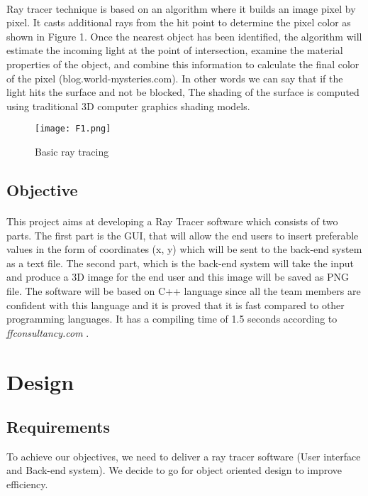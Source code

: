 \documentclass{article}
\begin{document}
\paragraph{}
Ray tracer technique is based on an algorithm where it builds an image pixel by pixel. It casts additional rays from the hit point to determine the pixel color as shown in Figure 1.
Once the nearest object has been identified, the algorithm will estimate the incoming light at the point of intersection, examine the material properties of the object, and combine this information to calculate the final color of the pixel (blog.world-mysteries.com). In other words we can say that if the light hits the surface and not be blocked,  The shading of the surface is computed using traditional 3D computer graphics shading models. 

\begin{figure}
    \centering
    \texttt{[image: F1.png]}
    \caption{Basic ray tracing}
    \label{figure1}
\end{figure}

\subsection{Objective}

\paragraph{}
This project aims at developing a Ray Tracer software which consists of two parts. The first part is the GUI, that will allow the end users to insert preferable values in the form of coordinates (x, y) which will be sent to the back-end system as a text file.
The second part, which is the back-end system will take the input and produce a 3D image for the end user and this image will be saved as PNG file. 
The software will be based on C++ language since all the team members are confident with this language and it is proved that it is fast compared to other programming languages. It has a compiling time of 1.5 seconds according to \textit{ffconsultancy.com }.


\section{Design}

\subsection{Requirements}
To achieve our objectives, we need to deliver a ray tracer software (User interface and Back-end system).  
We decide to go for object oriented design to improve efficiency.
\end{document}
